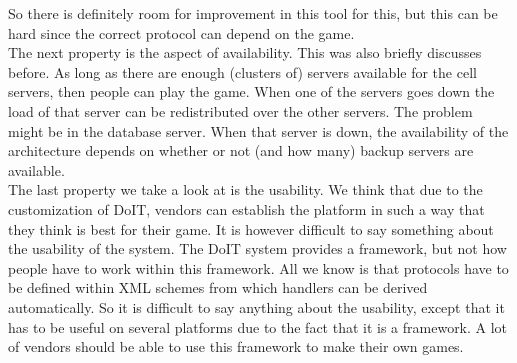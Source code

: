 So there is definitely room for improvement in this tool for this, but this can be hard since the correct protocol can depend on the game.\\
\indent The next property is the aspect of availability. 
This was also briefly discusses before. 
As long as there are enough (clusters of) servers available for the cell servers, then people can play the game. 
When one of the servers goes down the load of that server can be redistributed over the other servers. 
The problem might be in the database server. When that server is down, the availability of the architecture depends on whether or not (and how many) backup servers are available.\\
\indent The last property we take a look at is the usability.
We think that due to the customization of DoIT, vendors can establish the platform in such a way that they think is best for their game. 
It is however difficult to say something about the usability of the system. 
The DoIT system provides a framework, but not how people have to work within this framework. 
All we know is that protocols have to be defined within XML schemes from which handlers can be derived automatically. 
So it is difficult to say anything about the usability, except that it has to be useful on several platforms due to the fact that it is a framework. 
A lot of vendors should be able to use this framework to make their own games.